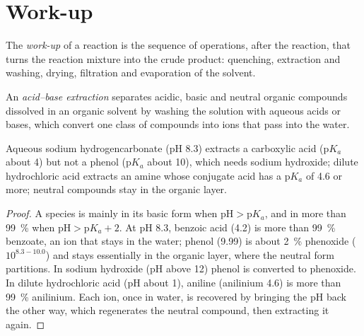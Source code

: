 \section{Work-up}

\begin{definition}[Work-up]\label{def:b2:lab-techniques-2:work-up}
The \emph{work-up} of a reaction is the sequence of operations, after the reaction, that
turns the reaction mixture into the crude product: quenching, extraction and washing, drying,
filtration and evaporation of the solvent.
\end{definition}

\begin{definition}\label{def:b2:lab-techniques-2:acid-base-extraction}
An \emph{acid--base extraction} separates acidic, basic and neutral organic
compounds dissolved in an organic solvent by washing the solution with aqueous acids or bases, which
convert one class of compounds into ions that pass into the water.
\end{definition}

\begin{proposition}\label{prop:b2:lab-techniques-2:acid-base-extraction}
Aqueous sodium hydrogencarbonate (pH 8.3) extracts a carboxylic acid ($\mathrm pK_a$ about 4) but not a
phenol ($\mathrm pK_a$ about 10), which needs sodium hydroxide; dilute hydrochloric acid extracts an
amine whose conjugate acid has a $\mathrm pK_a$ of 4.6 or more; neutral compounds stay in the organic
layer.
\end{proposition}

\begin{proof}
A species is mainly in its basic form when $\mathrm{pH} > \mathrm pK_a$, and in more than 99~\% when
$\mathrm{pH} > \mathrm pK_a + 2$. At pH 8.3, benzoic acid (4.2) is more than 99~\% benzoate, an ion
that stays in the water; phenol (9.99) is about 2~\% phenoxide ($10^{8.3 - 10.0}$) and stays essentially
in the organic layer, where the neutral form partitions. In sodium hydroxide (pH above 12) phenol is
converted to phenoxide. In dilute hydrochloric acid (pH about 1), aniline (anilinium 4.6) is more than
99~\% anilinium. Each ion, once in water, is recovered by bringing the pH back the other way, which
regenerates the neutral compound, then extracting it again.
\end{proof}

